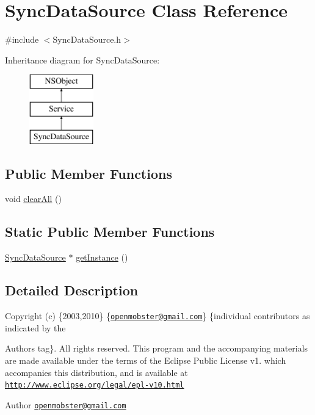 \hypertarget{interface_sync_data_source}{
\section{\-Sync\-Data\-Source \-Class \-Reference}
\label{interface_sync_data_source}
}


{\ttfamily \#include $<$\-Sync\-Data\-Source.\-h$>$}

\-Inheritance diagram for \-Sync\-Data\-Source\-:\begin{figure}[H]
\begin{center}
\leavevmode
\includegraphics[height=3.000000cm]{interface_sync_data_source}
\end{center}
\end{figure}
\subsection*{\-Public \-Member \-Functions}
\begin{DoxyCompactItemize}
\item 
void \hyperlink{interface_sync_data_source_ae6b9f102f533ca7f76a83525345ce209}{clear\-All} ()
\end{DoxyCompactItemize}
\subsection*{\-Static \-Public \-Member \-Functions}
\begin{DoxyCompactItemize}
\item 
\hyperlink{interface_sync_data_source}{\-Sync\-Data\-Source} $\ast$ \hyperlink{interface_sync_data_source_a3e362e202a1c75b84d43c445628c5453}{get\-Instance} ()
\end{DoxyCompactItemize}


\subsection{\-Detailed \-Description}
\-Copyright (c) \{2003,2010\} \{\href{mailto:openmobster@gmail.com}{\tt openmobster@gmail.\-com}\} \{individual contributors as indicated by the \begin{DoxyAuthor}{\-Authors}
tag\}. \-All rights reserved. \-This program and the accompanying materials are made available under the terms of the \-Eclipse \-Public \-License v1. which accompanies this distribution, and is available at \href{http://www.eclipse.org/legal/epl-v10.html}{\tt http\-://www.\-eclipse.\-org/legal/epl-\/v10.\-html}
\end{DoxyAuthor}
\begin{DoxyAuthor}{\-Author}
\href{mailto:openmobster@gmail.com}{\tt openmobster@gmail.\-com} 
\end{DoxyAuthor}


